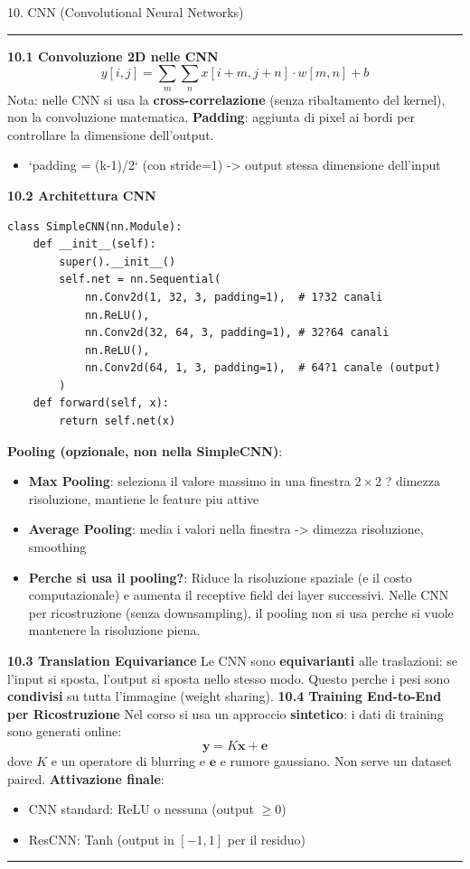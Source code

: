 \documentclass[italian,10pt]{beamer}
\begin{document}
\begin{frame}[allowframebreaks]{10. CNN (Convolutional Neural Networks)}
\medskip\noindent\rule{\textwidth}{0.4pt}\medskip
\textbf{10.1 Convoluzione 2D nelle CNN}
\[ y[i,j] = \sum_{m}\sum_{n} x[i+m, j+n] \cdot w[m,n] + b \]
Nota: nelle CNN si usa la \textbf{cross-correlazione} (senza ribaltamento del kernel), non la convoluzione matematica.
\textbf{Padding}: aggiunta di pixel ai bordi per controllare la dimensione dell'output.
\begin{itemize}
\item `padding = (k-1)/2` (con stride=1) -> output stessa dimensione dell'input
\end{itemize}
\textbf{10.2 Architettura CNN}
\end{frame}

\begin{lstlisting}[style=pp]
class SimpleCNN(nn.Module):
    def __init__(self):
        super().__init__()
        self.net = nn.Sequential(
            nn.Conv2d(1, 32, 3, padding=1),  # 1?32 canali
            nn.ReLU(),
            nn.Conv2d(32, 64, 3, padding=1), # 32?64 canali
            nn.ReLU(),
            nn.Conv2d(64, 1, 3, padding=1),  # 64?1 canale (output)
        )
    def forward(self, x):
        return self.net(x)
\end{lstlisting}
\begin{frame}{}
\textbf{Pooling (opzionale, non nella SimpleCNN)}:
\begin{itemize}
\item \textbf{Max Pooling}: seleziona il valore massimo in una finestra $2 \times 2$ ? dimezza risoluzione, mantiene le feature piu attive
\item \textbf{Average Pooling}: media i valori nella finestra -> dimezza risoluzione, smoothing
\item \textbf{Perche si usa il pooling?}: Riduce la risoluzione spaziale (e il costo computazionale) e aumenta il receptive field dei layer successivi. Nelle CNN per ricostruzione (senza downsampling), il pooling non si usa perche si vuole mantenere la risoluzione piena.
\end{itemize}
\textbf{10.3 Translation Equivariance}
Le CNN sono \textbf{equivarianti} alle traslazioni: se l'input si sposta, l'output si sposta nello stesso modo. Questo perche i pesi sono \textbf{condivisi} su tutta l'immagine (weight sharing).
\textbf{10.4 Training End-to-End per Ricostruzione}
Nel corso si usa un approccio \textbf{sintetico}: i dati di training sono generati online:
\[ \boldsymbol{y} = K\boldsymbol{x} + \boldsymbol{e} \]
dove $K$ e un operatore di blurring e $\boldsymbol{e}$ e rumore gaussiano. Non serve un dataset paired.
\textbf{Attivazione finale}:
\begin{itemize}
\item CNN standard: ReLU o nessuna (output $\geq 0$)
\item ResCNN: Tanh (output in $[-1, 1]$ per il residuo)
\end{itemize}
\medskip\noindent\rule{\textwidth}{0.4pt}\medskip
\end{frame}
\end{document}
